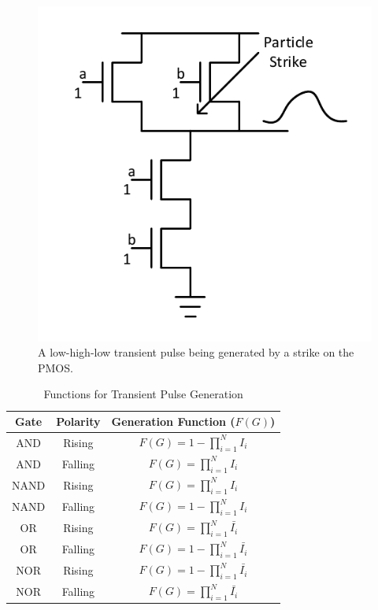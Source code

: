 \begin{figure}[!htbp]
	\centering
	\includegraphics[width=0.55\linewidth]{Figures/NAND_Strike}
	\caption{A low-high-low transient pulse being generated by a strike on the PMOS.}
	\label{NANDS}
\end{figure}

\begin{table}[h]
	\begin{center}
		\caption{Functions for Transient Pulse Generation}
		\label{table:gentable}
		\begin{tabular}{|c|c|c|}
			\hline
			Gate & Polarity & Generation Function ($F(G)$) \\ 
			\hline
			AND & Rising & $F(G) = 1 - \prod_{i=1}^{N} I_i$\\
			\hline
			AND & Falling & $F(G) = \prod_{i=1}^{N} I_i$\\
			\hline
			NAND & Rising & $F(G) = \prod_{i=1}^{N} I_i$ \\
			\hline
			NAND & Falling & $F(G) = 1 - \prod_{i=1}^{N} I_i$ \\
			\hline
			OR & Rising & $F(G) = \prod_{i=1}^{N} \bar{I_i}$ \\
			\hline
			OR & Falling & $F(G) = 1 - \prod_{i=1}^{N} \bar{I_i}$ \\
			\hline
			NOR & Rising & $F(G) = 1 - \prod_{i=1}^{N} \bar{I_i}$ \\
			\hline
			NOR & Falling & $F(G) = \prod_{i=1}^{N} \bar{I_i}$ \\
			\hline
		\end{tabular}
	\end{center}
\end{table}

